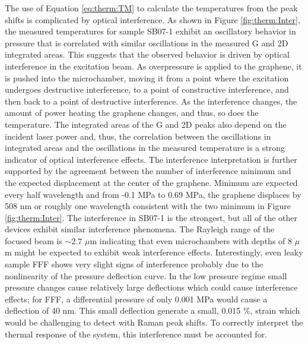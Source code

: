 The use of Equation \ref{eq:therm:TM} to calculate the temperatures from the peak shifts is complicated by optical interference.
As shown in Figure \ref{fig:therm:Inter}, the measured temperatures for sample SB07-1 exhibit an oscillatory behavior in pressure that is correlated with similar oscillations in the measured G and 2D integrated areas.
This suggests that the observed behavior is driven by optical interference in the excitation beam.
As overpressure is applied to the graphene, it is pushed into the microchamber, moving it from a point where the excitation undergoes destructive interference, to a point of constructive interference, and then back to a point of destructive interference.
As the interference changes, the amount of power heating the graphene changes, and thus, so does the temperature.
The integrated areas of the G and 2D peaks also depend on the incident laser power and, thus, the correlation between the oscillations in integrated areas and the oscillations in the measured temperature is a strong indicator of optical interference effects.
The interference interpretation is further supported by the agreement between the number of interference minimum and the expected displacement at the center of the graphene.
Minimum are expected every half wavelength and from -0.1 MPa to 0.69 MPa, the graphene displaces by 508 nm or roughly one wavelength consistent with the two minimum in Figure \ref{fig:therm:Inter}.
The interference in SB07-1 is the strongest, but all of the other devices exhibit similar interference phenomena.
The Rayleigh range of the focused beam is $\sim 2.7$ $\mu$m indicating that even microchambers with depths of 8 $\mu$m might be expected to exhibit weak interference effects.
Interestingly, even leaky sample FFF shows very slight signs of interference probably due to the nonlinearity of the pressure deflection curve.
In the low pressure regime small pressure changes cause relatively large deflections which could cause interference effects; for FFF, a differential pressure of only 0.001 MPa would cause a deflection of 40 nm.
This small deflection generate a small, 0.015 \%, strain which would be challenging to detect with Raman peak shifts.
To correctly interpret the thermal response of the system, this interference must be accounted for.

